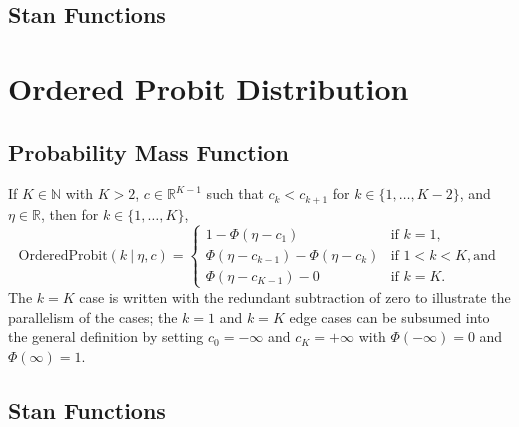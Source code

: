 \begin{description}
{\begin{description}


\subsection{Stan Functions}


\begin{description}     \end{description}


\section{Ordered Probit Distribution}


\subsection{Probability Mass Function}


If $K \in \mathbb{N}$ with $K > 2$, $c \in \mathbb{R}^{K-1}$ such that $c_k < c_{k+1}$ for $k \in \{1,\ldots,K-2\}$, and $\eta \in \mathbb{R}$, then for $k \in \{1,\ldots,K\}$, \[ \text{OrderedProbit}(k~|~\eta,c) = \left\{ \begin{array}{ll} 1 - \Phi(\eta - c_1) & \text{if } k = 1, \\[4pt] \Phi(\eta - c_{k-1}) - \Phi(\eta - c_{k})  & \text{if } 1 < k < K, \text{and} \\[4pt] \Phi(\eta - c_{K-1}) - 0 & \text{if } k = K. \end{array} \right. \] The $k=K$ case is written with the redundant subtraction of zero to illustrate the parallelism of the cases; the $k=1$ and $k=K$ edge cases can be subsumed into the general definition by setting $c_0 = -\infty$ and $c_K = +\infty$ with $\Phi(-\infty) = 0$ and $\Phi(\infty) = 1$.




\subsection{Stan Functions}



\end{description}}
\end{description}
